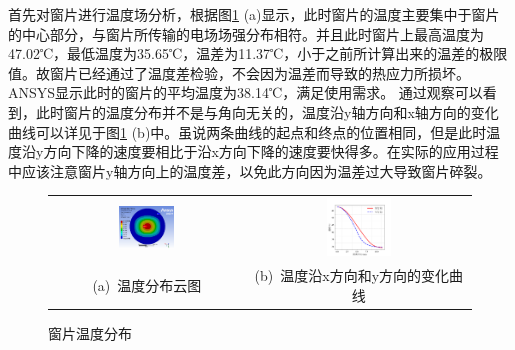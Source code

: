 \documentclass[master]{thesis-uestc}
\begin{document}
首先对窗片进行温度场分析，根据图\ref{fig:X输入温度场} (a)显示，此时窗片的温度主要集中于窗片的中心部分，与窗片所传输的电场场强分布相符。并且此时窗片上最高温度为47.02℃，最低温度为35.65℃，温差为11.37℃，小于之前所计算出来的温差的极限值。故窗片已经通过了温度差检验，不会因为温差而导致的热应力所损坏。ANSYS显示此时的窗片的平均温度为38.14℃，满足使用需求。
通过观察可以看到，此时窗片的温度分布并不是与角向无关的，温度沿y轴方向和x轴方向的变化曲线可以详见于图\ref{fig:X输入温度场} (b)中。虽说两条曲线的起点和终点的位置相同，但是此时温度沿y方向下降的速度要相比于沿x方向下降的速度要快得多。在实际的应用过程中应该注意窗片y轴方向上的温度差，以免此方向因为温差过大导致窗片碎裂。
\begin{figure}[!htb]
    \small
    \centering
    \begin{tabular}{@{\ }c@{\ }c}
        \includegraphics[width=0.3\textwidth]{pic/chapter3/X频段温度分布.png} & 
        \hspace{5pt}
        \includegraphics[width=0.3\textwidth]{pic/chapter3/窗片温度沿半径分布.png}     \\
        \mbox{\small (a) 温度分布云图}                                                                               & 
        \mbox{\small (b) 温度沿x方向和y方向的变化曲线}                                                                                  \\
    \end{tabular}
    \caption{窗片温度分布}
    \label{fig:X输入温度场}
\end{figure}
\end{document}
